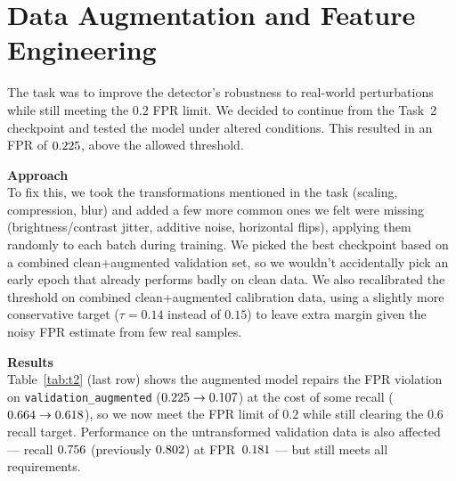 \section{Data Augmentation and Feature Engineering}
The task was to improve the detector's robustness to real-world perturbations
while still meeting the $0.2$ FPR limit.
We decided to continue from the Task~2 checkpoint and tested the model under
altered conditions. This resulted in an FPR of $0.225$, above the allowed
threshold.

\textbf{Approach}\\
To fix this, we took the transformations mentioned in the task
(scaling, compression, blur) and added a few more common
ones we felt were missing (brightness/contrast jitter, additive noise,
horizontal flips), applying them randomly to each batch during training.
We picked the best checkpoint based on a combined clean+augmented validation
set, so we wouldn't accidentally pick an early epoch that already performs badly
on clean data. We also recalibrated the threshold on combined clean+augmented
calibration data, using a slightly more conservative target
($\tau = 0.14$ instead of $0.15$) to leave extra margin given the noisy FPR
estimate from few real samples.

\textbf{Results}\\
Table~\ref{tab:t2} (last row) shows the augmented model repairs the FPR
violation on \texttt{validation\_augmented} ($0.225 \to 0.107$) at the
cost of some recall ($0.664 \to 0.618$), so we now meet the FPR
limit of $0.2$ while still clearing the $0.6$ recall target.
Performance on the untransformed validation data is also affected --- recall
$0.756$ (previously $0.802$) at FPR~$0.181$ --- but still
meets all requirements.
